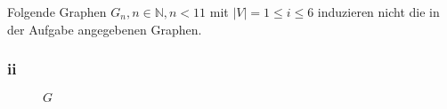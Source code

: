 \documentclass[12pt]{article}
\newcommand{\N}{\mathbb{N}}
\begin{document}
Folgende Graphen $G_n, n \in \N, n < 11$ mit $|V| = 1 \le i \le 6$ induzieren nicht die  in der Aufgabe angegebenen Graphen.


\begin{figure}[h] 
	\centering
    \subfigure[$G_1$]{\scalebox{.7}{}} 
	\hspace{1cm}
    \subfigure[$G_2$]{\scalebox{.7}{}} 
	\hspace{1cm}
	\subfigure[$G_3$]{\scalebox{.7}{}}
\end{figure} 


\begin{figure}[h] 
	\centering
    \subfigure[$G_4$]{\scalebox{.7}{}} 
	\hspace{1cm}
    \subfigure[$G_5$]{\scalebox{.7}{}} 
	\hspace{1cm}
	\subfigure[$G_6$]{\scalebox{.7}{}}
\end{figure} 

\newpage
\begin{figure}[h] 
	\centering
    \subfigure[$G_7$]{\scalebox{.7}{}} 
	\hspace{2.5cm}
    \subfigure[$G_8$]{\scalebox{.7}{}} 
\end{figure} 


\begin{figure}[h] 
	\centering
    \subfigure[$G_9$]{\scalebox{.7}{}} 
	\hspace{2.5cm}
    \subfigure[$G_10$]{\scalebox{.7}{}} 
\end{figure} 





\subsubsection*{ii}

\begin{figure}[h]
	\centering
	\scalebox{.7}{}
	\caption{$G$} 
	\label{img:grafi-doom}
\end{figure}


\end{document}
